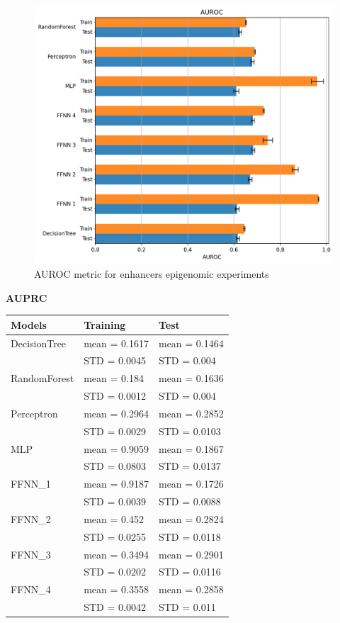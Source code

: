 \begin{figure}[h!]
	\centering
	\includegraphics[width=0.77\linewidth]{../images/epigemomic_results/enhancers/auroc.png}
	\caption{AUROC metric for enhancers epigenomic experiments}
\end{figure}

\textbf{AUPRC}

\begin{longtable}[]{@{}lll@{}}
	\toprule
	\textbf{Models} & \textbf{Training} & \textbf{Test}\tabularnewline
	\midrule
	\endhead
	DecisionTree & mean = 0.1617 & mean = 0.1464\tabularnewline
	& STD = 0.0045 & STD = 0.004\tabularnewline
	RandomForest & mean = 0.184 & mean = 0.1636\tabularnewline
	& STD = 0.0012 & STD = 0.004\tabularnewline
	Perceptron & mean = 0.2964 & mean = 0.2852\tabularnewline
	& STD = 0.0029 & STD = 0.0103\tabularnewline
	MLP & mean = 0.9059 & mean = 0.1867\tabularnewline
	& STD = 0.0803 & STD = 0.0137\tabularnewline
	FFNN\_1 & mean = 0.9187 & mean = 0.1726\tabularnewline
	& STD = 0.0039 & STD = 0.0088\tabularnewline
	FFNN\_2 & mean = 0.452 & mean = 0.2824\tabularnewline
	& STD = 0.0255 & STD = 0.0118\tabularnewline
	FFNN\_3 & mean = 0.3494 & mean = 0.2901\tabularnewline
	& STD = 0.0202 & STD = 0.0116\tabularnewline
	FFNN\_4 & mean = 0.3558 & mean = 0.2858\tabularnewline
	& STD = 0.0042 & STD = 0.011\tabularnewline
	\bottomrule
\end{longtable}

